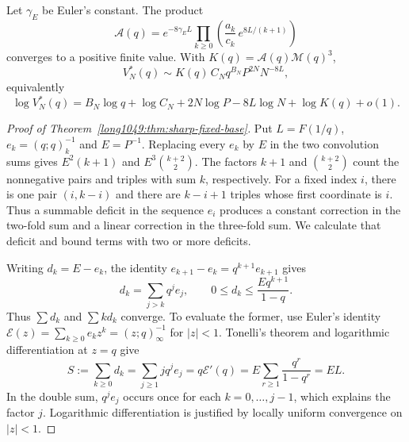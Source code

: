 \documentclass[11pt]{article}
\begin{document}
\begin{theorem}
\label{long1049:thm:sharp-fixed-base}
Let $\gamma_{\!E}$ be Euler's constant. The product
\[
 \mathcal A(q)=e^{-8\gamma_{\!E}L}
 \prod_{k\ge0}\left(\frac{a_k}{c_k}\,e^{8L/(k+1)}\right)
\]
converges to a positive finite value. With $K(q)=\mathcal A(q)\mathcal M(q)^3$,
\[
 V_N^*(q)\sim K(q)\,C_Nq^{B_N}P^{2N}N^{-8L},
\]
equivalently
\[
 \log V_N^*(q)=B_N\log q+\log C_N+2N\log P-8L\log N+\log K(q)+o(1).
\]
\end{theorem}

\begin{proof}[Proof of Theorem~\ref{long1049:thm:sharp-fixed-base}]
Put $L=F(1/q)$, $e_k=(q;q)_k^{-1}$ and $E=P^{-1}$.
Replacing every $e_k$ by $E$ in the two convolution sums gives
$E^2(k+1)$ and $E^3\binom{k+2}{2}$. The factors $k+1$ and
$\binom{k+2}{2}$ count the nonnegative pairs and triples with sum $k$,
respectively.
For a fixed index $i$, there is one pair $(i,k-i)$ and there are
$k-i+1$ triples whose first coordinate is $i$. Thus a summable
deficit in the sequence $e_i$ produces a constant correction in the
two-fold sum and a linear correction in the three-fold sum.
We calculate that deficit and bound terms with two or more deficits.

Writing $d_k=E-e_k$, the identity
$e_{k+1}-e_k=q^{k+1}e_{k+1}$ gives
\[
 d_k=\sum_{j>k}q^je_j,\qquad
 0\le d_k\le\frac{E q^{k+1}}{1-q}.
\]
Thus $\sum d_k$ and $\sum k d_k$ converge. To evaluate the former,
use Euler's identity
$\mathcal E(z)=\sum_{k\ge0}e_kz^k=(z;q)_\infty^{-1}$ for $|z|<1$.
Tonelli's theorem and logarithmic differentiation at $z=q$ give
\[
 S:=\sum_{k\ge0}d_k
 =\sum_{j\ge1}j q^je_j
 =q\mathcal E'(q)
 =E\sum_{r\ge1}\frac{q^r}{1-q^r}=EL.
\]
In the double sum, $q^je_j$ occurs once for each $k=0,\ldots,j-1$,
which explains the factor $j$. Logarithmic differentiation is
justified by locally uniform convergence on $|z|<1$.


\end{proof}
\end{document}
